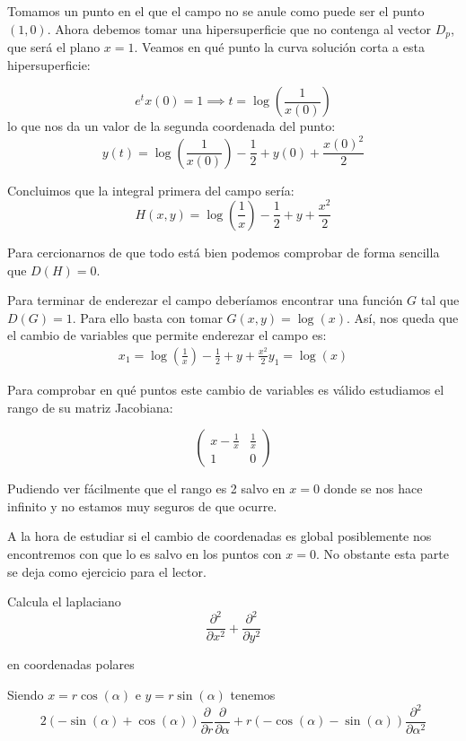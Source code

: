 \begin{problem}[5]
Tomamos un punto en el que el campo no se anule como puede ser el punto $(1,0)$. Ahora debemos tomar una hipersuperficie que no contenga al vector $D_p$, que será el plano $x=1$. Veamos en qué punto la curva solución corta a esta hipersuperficie:

\[e^t x(0)= 1 \implies t = \log\left(\frac{1}{x(0)}\right)\]
lo que nos da un valor de la segunda coordenada del punto:
\[y(t)=\log\left(\frac{1}{x(0)}\right)-\frac{1}{2}+y(0)+\frac{x(0)^2}{2}\]

Concluimos que la integral primera del campo sería:
\[H(x,y)=\log\left(\frac{1}{x}\right)-\frac{1}{2}+y+\frac{x^2}{2}\]

Para cercionarnos de que todo está bien podemos comprobar de forma sencilla que $D(H)=0$.

Para terminar de enderezar el campo deberíamos encontrar una función $G$ tal que $D(G)=1$. Para ello basta con tomar $G(x,y)=\log(x)$. Así, nos queda que el cambio de variables que permite enderezar el campo es:
\begin{align}
x_1 = \log\left(\frac{1}{x}\right)-\frac{1}{2}+y+\frac{x^2}{2}
y_1 = \log(x)
\end{align}

Para comprobar en qué puntos este cambio de variables es válido estudiamos el rango de su matriz Jacobiana:

\[\left( \begin{array}{cc}
x-\frac{1}{x} & \frac{1}{x}  \\
1 & 0  \end{array} \right)\]

Pudiendo ver fácilmente que el rango es 2 salvo en $x=0$ donde se nos hace infinito y no estamos muy seguros de que ocurre.

A la hora de estudiar si el cambio de coordenadas es global posiblemente nos encontremos con que lo es salvo en los puntos con $x=0$. No obstante esta parte se deja como ejercicio para el lector.
\end{problem}

\begin{problem}[6]
Calcula el laplaciano
\[\frac{\partial^2}{\partial x^2}+\frac{\partial^2}{\partial y^2}\]

en coordenadas polares

\solution
\yoP

Siendo $x=r\cos(α)$ e $y=r\sin(α)$ tenemos
\[2(-\sin(α)+\cos(α))\frac{\partial}{\partial r}\frac{\partial}{\partial α}+r(-\cos(α)-\sin(α))\frac{\partial^2}{\partial α^2}\]
\end{problem}


